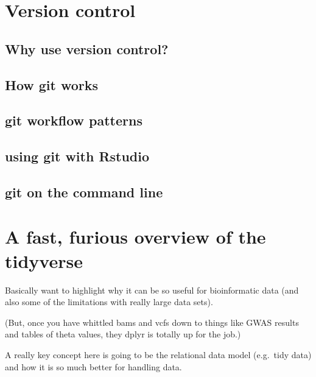 \documentclass[]{krantz}
\begin{document}
\hypertarget{version-control}{%
\chapter{Version control}\label{version-control}}

\hypertarget{why-use-version-control}{%
\section{Why use version control?}\label{why-use-version-control}}

\hypertarget{git-workings}{%
\section{How git works}\label{git-workings}}

\hypertarget{git-workflow-patterns}{%
\section{git workflow patterns}\label{git-workflow-patterns}}

\hypertarget{using-git-with-rstudio}{%
\section{using git with Rstudio}\label{using-git-with-rstudio}}

\hypertarget{git-on-the-command-line}{%
\section{git on the command line}\label{git-on-the-command-line}}

\hypertarget{a-fast-furious-overview-of-the-tidyverse}{%
\chapter{A fast, furious overview of the tidyverse}\label{a-fast-furious-overview-of-the-tidyverse}}

Basically want to highlight why it can be so useful for bioinformatic
data (and also some of the limitations with really large data sets).

(But, once you have whittled bams and vcfs down to things like GWAS results
and tables of theta values, they dplyr is totally up for the job.)

A really key concept here is going to be the relational data model
(e.g.~tidy data) and how it is so much better for handling data.
\end{document}
